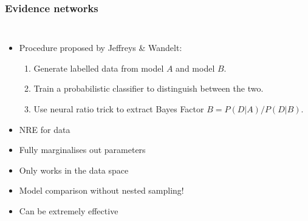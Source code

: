 \documentclass[aspectratio=169]{beamer}
\begin{document}
\begin{frame}
    \frametitle{Evidence networks~}
    \begin{columns}
    \begin{itemize}
        \item Procedure proposed by Jeffreys \& Wandelt:
            \begin{enumerate}
                \item Generate labelled data from model $A$ and model $B$.
                \item Train a probabilistic classifier to distinguish between the two.
                \item Use neural ratio trick to extract Bayes Factor $B = P(D|A)/P(D|B)$.
            \end{enumerate}
        \item NRE for data
        \item Fully marginalises out parameters
        \item Only works in the data space
        \item Model comparison without nested sampling!
        \item Can be extremely effective
    \end{itemize}
        

\end{columns}
\end{frame}
\end{document}
